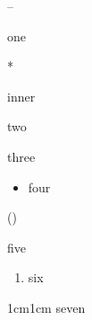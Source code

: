 \documentclass{memoir}
\begin{document}
\begin{list}{--}{}
\item one
\begin{list}{*}{}
\item inner
\end{list}
\item two
\item[x] three
\begin{itemize}
\item four
\end{itemize}
\end{list}
\begin{list}{()}{}
\item five
\end{list}
\begin{enumerate}
\item six
\end{enumerate}
\begin{adjustwidth}{1cm}{1cm}
seven
\end{adjustwidth}
\end{document}
